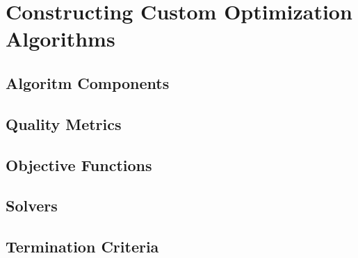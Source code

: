 \chapter{Constructing Custom Optimization Algorithms}

\section{Algoritm Components}

\section{Quality Metrics}

\section{Objective Functions}

\section{Solvers}

\section{Termination Criteria \label{sec:termination}}
